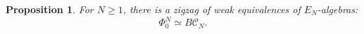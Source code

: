 \documentclass[12pt]{amsart}
\theoremstyle{plain}
\newtheorem{prop}[teo]{Proposition}
\theoremstyle{definition}
\newtheorem{defi}[teo]{Definition}
\theoremstyle{remark}
\newcommand{\C}{\mathcal{C}}
\begin{document}

\begin{prop}\label{deloopinglevelone}
For $N\geq 1$, there is a zigzag of weak equivalences of $E_N$-algebras:
\[\Phi_0^N \simeq B\C_N.\]
\end{prop}
\end{document}
